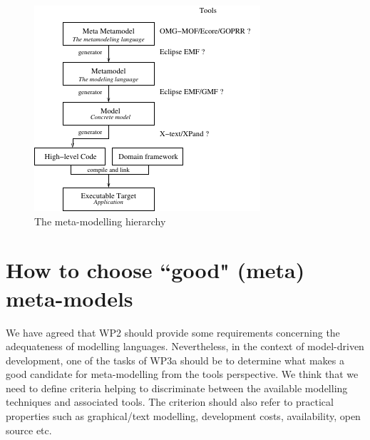\documentclass[11pt, a4paper]{article}
\begin{document}
\begin{figure}[htbp]
\includegraphics[width=\textwidth]{metamodelinghier.pdf}
\caption{The meta-modelling hierarchy}
\label{fig:model_hier}
\end{figure}

\section{How to choose ``good" (meta) meta-models}
We have  agreed that   WP2 should provide some requirements concerning the adequateness of modelling
languages. Nevertheless, in the context of model-driven
development,  one of the tasks of WP3a should be to determine what makes a good
candidate for meta-modelling from the tools perspective.
We think that we need to define criteria helping to discriminate between the
available modelling techniques and associated tools. 
The criterion should also refer to practical properties such as graphical/text
modelling, development costs, availability, open source etc. 
\end{document}
